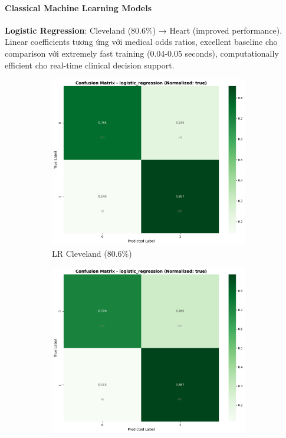 \paragraph{Classical Machine Learning Models}

\textbf{Logistic Regression}: Cleveland (80.6\%) → Heart (improved performance). Linear coefficients tương ứng với medical odds ratios, excellent baseline cho comparison với extremely fast training (0.04-0.05 seconds), computationally efficient cho real-time clinical decision support.

\begin{figure}[H]
\centering
\begin{subfigure}[b]{0.31\textwidth}
\centering
\includegraphics[width=0.95\textwidth]{Result/cleveland_dataset/confusion_matrices/logistic_regression_numeric_dataset_StandardScaler.png}
\caption{LR Cleveland (80.6\%)}
\label{fig:lr_cleveland_confusion}
\end{subfigure}
\hfill
\begin{subfigure}[b]{0.31\textwidth}
\centering
\includegraphics[width=0.95\textwidth]{Result/heart_dataset/confusion_matrices/logistic_regression_numeric_dataset_StandardScaler.png}

\end{subfigure}
\end{figure}
